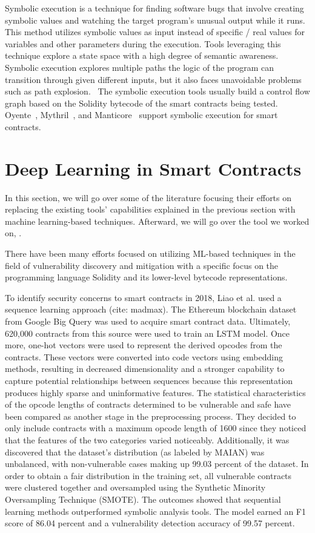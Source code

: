 Symbolic execution is a technique for finding software bugs that involve creating symbolic values and watching the target program's unusual output while it runs.
This method utilizes symbolic values as input instead of specific / real values for variables and other parameters during the execution.
Tools leveraging this technique explore a state space with a high degree of semantic awareness.~\cite{boyer1975select}
Symbolic execution explores multiple paths the logic of the program can transition through given different inputs, but it also faces unavoidable problems such as path explosion.~\cite{baldoni2018survey}
The symbolic execution tools usually build a control flow graph based on the Solidity bytecode of the smart contracts being tested.
Oyente~\cite{oyente}, Mythril~\cite{mythril}, and Manticore~\cite{mossberg2019manticore} support symbolic execution for smart contracts.


\section{Deep Learning in Smart Contracts} \label{sec:dl-models}

In this section, we will go over some of the literature focusing their efforts on replacing the existing tools' capabilities explained in the previous section with machine learning-based techniques.
Afterward, we will go over the tool we worked on, \slithersimil.

There have been many efforts focused on utilizing ML-based techniques in the field of vulnerability discovery and mitigation with a specific focus on the programming language Solidity and
its lower-level bytecode representations.

To identify security concerns to smart contracts in 2018, Liao et al. used a sequence learning approach (cite: madmax).
The Ethereum blockchain dataset from Google Big Query was used to acquire smart contract data.
Ultimately, 620,000 contracts from this source were used to train an LSTM model. Once more, one-hot vectors were used to represent the derived opcodes from the contracts.
These vectors were converted into code vectors using embedding methods, resulting in decreased dimensionality and a stronger capability to capture potential relationships between sequences because this representation produces highly sparse and uninformative features.
The statistical characteristics of the opcode lengths of contracts determined to be vulnerable and safe have been compared as another stage in the preprocessing process.
They decided to only include contracts with a maximum opcode length of 1600 since they noticed that the features of the two categories varied noticeably.
Additionally, it was discovered that the dataset's distribution (as labeled by MAIAN) was unbalanced, with non-vulnerable cases making up 99.03 percent of the dataset.
In order to obtain a fair distribution in the training set, all vulnerable contracts were clustered together and oversampled using the Synthetic Minority Oversampling Technique (SMOTE).
The outcomes showed that sequential learning methods outperformed symbolic analysis tools.
The model earned an F1 score of 86.04 percent and a vulnerability detection accuracy of 99.57 percent.

